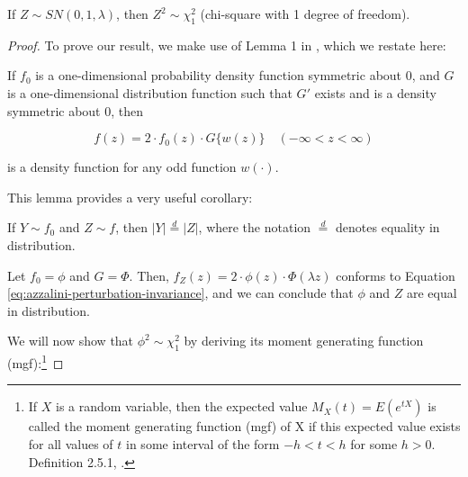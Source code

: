 \begin{property} \label{prop:2}
  If $Z \sim SN(0, 1, \lambda)$, then $Z^2 \sim \chi^2_1$ (chi-square with 1 degree of freedom).
\end{property}

\begin{proof}
  To prove our result, we make use of Lemma 1 in \citet{azzalini}, which we
  restate here:

  \begin{helper-lem}
    If $f_0$ is a one-dimensional probability density function symmetric about
    0, and $G$ is a one-dimensional distribution function such that $G'$ exists
    and is a density symmetric about 0, then

    \begin{equation}
      \label{eq:azzalini-perturbation-invariance}
      f(z) = 2 \cdot f_0(z) \cdot G\{w(z)\} \quad (-\infty < z < \infty)
    \end{equation}

    is a density function for any odd function $w(\cdot)$.
  \end{helper-lem}

  This lemma provides a very useful corollary:

  \begin{helper-cor}
    If $Y \sim f_0$ and $Z \sim f$, then $|Y| \overset{d}{=} |Z|$, where the
    notation $\overset{d}{=}$ denotes equality in distribution.    
  \end{helper-cor}

  Let $f_0 = \phi$ and $G = \Phi$. Then, $f_Z(z) = 2 \cdot \phi(z) \cdot
  \Phi(\lambda z)$ conforms to Equation
  \eqref{eq:azzalini-perturbation-invariance}, and we can conclude that $\phi$
  and $Z$ are equal in distribution.

  We will now show that $\phi^2 \sim \chi^2_1$ by deriving its moment
  generating function (mgf):\footnote{If $X$ is a random variable, then the
  expected value $M_X(t) = E(e^{tX})$ is called the moment generating function
  (mgf) of X if this expected value exists for all values of $t$ in some
  interval of the form $-h < t < h$ for some $h > 0$. Definition 2.5.1,
  \citet{textbook}.}


\end{proof}

